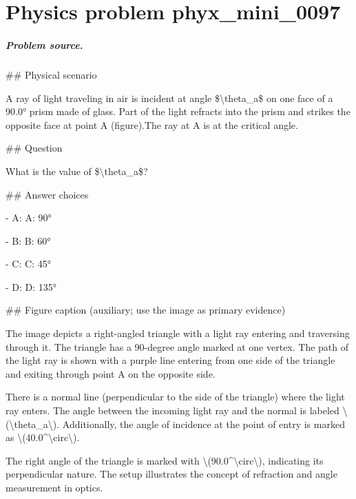 
\chapter{Physics problem phyx\_mini\_0097}
\label{ch:PhyXMiniProblems_problem_phyx_mini_0097}

\paragraph{Problem source.}
\#\# Physical scenario

A ray of light traveling in air is incident at angle \$\textbackslash{}theta\_a\$ on one face of a 90.0° prism made of glass. Part of the light refracts into the prism and strikes the opposite face at point A (figure).The ray at A is at the critical angle.

\#\# Question

What is the value of \$\textbackslash{}theta\_a\$?

\#\# Answer choices

- A: A:  90°

- B: B:  60°

- C: C:  45°

- D: D:  135°

\#\# Figure caption (auxiliary; use the image as primary evidence)

The image depicts a right-angled triangle with a light ray entering and traversing through it. The triangle has a 90-degree angle marked at one vertex. The path of the light ray is shown with a purple line entering from one side of the triangle and exiting through point A on the opposite side.

There is a normal line (perpendicular to the side of the triangle) where the light ray enters. The angle between the incoming light ray and the normal is labeled \textbackslash{}(\textbackslash{}theta\_a\textbackslash{}). Additionally, the angle of incidence at the point of entry is marked as \textbackslash{}(40.0\textasciicircum{}\textbackslash{}circ\textbackslash{}). 

The right angle of the triangle is marked with \textbackslash{}(90.0\textasciicircum{}\textbackslash{}circ\textbackslash{}), indicating its perpendicular nature. The setup illustrates the concept of refraction and angle measurement in optics.

